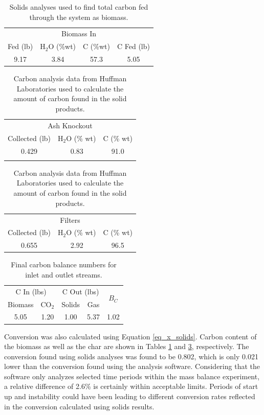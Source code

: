 \documentclass[11pt,twocolumn]{article}
\begin{document}
\begin{table}
\centering
\caption{Solids analyses used to find total carbon fed through the system as biomass.}
\label{biomass}
\begin{tabular}{c c c c}
	\toprule
	\multicolumn{4}{c}{Biomass In}	\\
	Fed (lb)	&	H$_2$O (\%wt)	&	C (\%wt)	&	C Fed (lb)	\\
	\midrule
	9.17		&	3.84			&	57.3		&	5.05		\\	
	\bottomrule
\end{tabular}
\end{table}

\begin{table}
\centering
\caption{Carbon analysis data from Huffman Laboratories used to calculate the amount of carbon found in the solid products.}
\label{char}
\begin{tabular}{c c c}
	\toprule
	\multicolumn{3}{c}{Ash Knockout}	\\
	Collected (lb)	&	H$_2$O (\% wt)		&	C (\% wt)	\\
	\midrule
	0.429	&	0.83	&	91.0 	\\
	\bottomrule
	{}	&	{}	&	{}	\\
\end{tabular}
\begin{tabular}{c c c}
	\toprule
	\multicolumn{3}{c}{Filters}	\\
	Collected (lb)	&	H$_2$O (\% wt)		&	C (\% wt)	\\
	\midrule
	0.655	&	2.92	&	96.5	\\
	\bottomrule
\end{tabular}
\end{table}

\begin{table}
	\centering
	\caption{Final carbon balance numbers for inlet and outlet streams.}
	\label{tbl_balance}
	\begin{tabular}{c c c c c}
	\toprule
	\multicolumn{2}{c}{C In (lbs)}	&	\multicolumn{2}{c}{C Out (lbs)}	&	\multirow{2}{*}{$B_C$}	\\
	Biomass	&	CO$_2$	&	Solids	&	Gas						&	{}			\\
	\midrule
	5.05		&	1.20		&	1.00	&	5.37						&	1.02		\\
	\bottomrule
	\end{tabular}
\end{table}

Conversion was also calculated using Equation \ref{eq_x_solids}.  Carbon content of the biomass as well as the char are shown in Tables \ref{biomass} and \ref{char}, respectively.  The conversion found using solids analyses was found to be 0.802, which is only 0.021 lower than the conversion found using the analysis software.  Considering that the software only analyzes selected time periods within the mass balance experiment, a relative difference of 2.6\% is certainly within acceptable limits.  Periods of start up and instability could have been leading to different conversion rates reflected in the conversion calculated using solids results.
\end{document}
